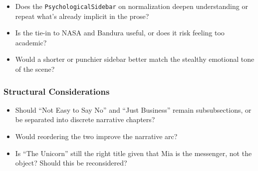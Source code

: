 \begin{itemize}
  \item Does the \texttt{PsychologicalSidebar} on normalization deepen understanding or repeat what’s already implicit in the prose?
  \item Is the tie-in to NASA and Bandura useful, or does it risk feeling too academic?
  \item Would a shorter or punchier sidebar better match the stealthy emotional tone of the scene?
\end{itemize}

\subsubsection*{Structural Considerations}

\begin{itemize}
  \item Should “Not Easy to Say No” and “Just Business” remain subsubsections, or be separated into discrete narrative chapters?
  \item Would reordering the two improve the narrative arc?
  \item Is “The Unicorn” still the right title given that Mia is the messenger, not the object? Should this be reconsidered?
\end{itemize}

